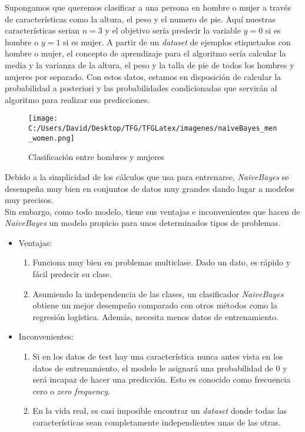 Supongamos que queremos clasificar a una persona en hombre o mujer a través de características como 
la altura, el peso y el numero de pie. Aquí nuestras características serian $n=3$ y el objetivo 
sería predecir la variable $y=0$ si es hombre o $y=1$ si es mujer.
A partir de un \textit{dataset} de ejemplos etiquetados con hombre o mujer,
el concepto de aprendizaje para el algoritmo  sería calcular la media y la varianza 
de la altura, el peso y la talla de pie de todos los hombres y mujeres por separado.
Con estos datos, estamos en disposición de calcular la probabilidad a posteriori y las probabilidades 
condicionadas que servirán al algoritmo para realizar sus predicciones.

\begin{figure}[!htpb]
  \centering
  \texttt{[image: C:/Users/David/Desktop/TFG/TFGLatex/imagenes/naiveBayes\_men\_women.png]}
  \caption[Naive Bayes clasificación]{Clasificación entre hombres y mujeres}
  \label{men_women_boundary}
\end{figure}

Debido a la simplicidad de los cálculos que usa para entrenarse, \textit{NaiveBayes} se desempeña muy bien 
en conjuntos de datos muy grandes dando lugar a modelos muy precisos.\\
Sin embargo, como todo modelo, tiene sus ventajas e inconvenientes que hacen de \textit{NaiveBayes} un modelo 
propicio para unos determinados tipos de problemas.

\begin{itemize}
  \item Ventajas:
  \begin{enumerate}
    \item Funciona muy bien en problemas multiclase. Dado un dato, es rápido y fácil predecir su clase.
    \item Asumiendo la independencia de las clases, un clasificador \textit{NaiveBayes} obtiene un mejor 
    desempeño comparado con otros métodos como la regresión logística. Además, necesita menos datos 
    de entrenamiento.
  \end{enumerate}
  \item Inconvenientes:
  \begin{enumerate}
    \item Si en los datos de test hay una característica nunca antes vista en los datos de 
    entrenamiento, el modelo le asignará una probabilidad de 0 y será incapaz de hacer una predicción.
    Esto es conocido como frecuencia cero o \textit{zero frequency}.
    \item En la vida real, es casi imposible encontrar un \textit{dataset} donde todas las características 
    sean completamente independientes unas de las otras.
  \end{enumerate}
\end{itemize}

